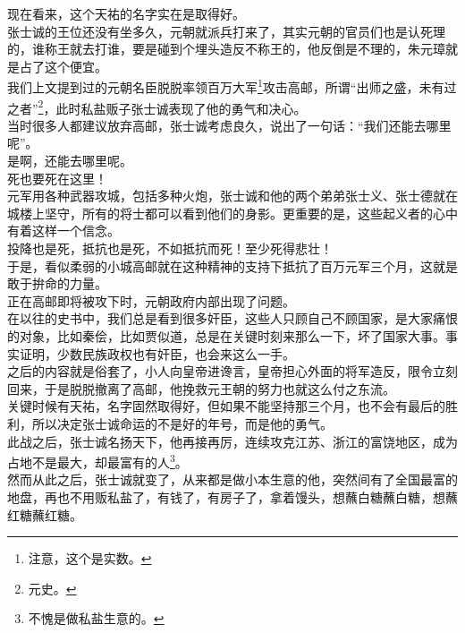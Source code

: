 \begin{multicols}{\theparacolNo}
现在看来，这个天祐的名字实在是取得好。\\

张士诚的王位还没有坐多久，元朝就派兵打来了，其实元朝的官员们也是认死理的，谁称王就去打谁，要是碰到个埋头造反不称王的，他反倒是不理的，朱元璋就是占了这个便宜。\\

我们上文提到过的元朝名臣脱脱率领百万大军\footnote{注意，这个是实数。}攻击高邮，所谓“出师之盛，未有过之者”\footnote{元史。}，此时私盐贩子张士诚表现了他的勇气和决心。\\

当时很多人都建议放弃高邮，张士诚考虑良久，说出了一句话：“我们还能去哪里呢”。\\

是啊，还能去哪里呢。\\

死也要死在这里！\\

元军用各种武器攻城，包括多种火炮，张士诚和他的两个弟弟张士义、张士德就在城楼上坚守，所有的将士都可以看到他们的身影。更重要的是，这些起义者的心中有着这样一个信念。\\

投降也是死，抵抗也是死，不如抵抗而死！至少死得悲壮！\\

于是，看似柔弱的小城高邮就在这种精神的支持下抵抗了百万元军三个月，这就是敢于拚命的力量。\\

正在高邮即将被攻下时，元朝政府内部出现了问题。\\

在以往的史书中，我们总是看到很多奸臣，这些人只顾自己不顾国家，是大家痛恨的对象，比如秦侩，比如贾似道，总是在关键时刻来那么一下，坏了国家大事。事实证明，少数民族政权也有奸臣，也会来这么一手。\\

之后的内容就是俗套了，小人向皇帝进谗言，皇帝担心外面的将军造反，限令立刻回来，于是脱脱撤离了高邮，他挽救元王朝的努力也就这么付之东流。\\

关键时候有天祐，名字固然取得好，但如果不能坚持那三个月，也不会有最后的胜利，所以决定张士诚命运的不是好的年号，而是他的勇气。\\

此战之后，张士诚名扬天下，他再接再厉，连续攻克江苏、浙江的富饶地区，成为占地不是最大，却最富有的人\footnote{不愧是做私盐生意的。}。\\

然而从此之后，张士诚就变了，从来都是做小本生意的他，突然间有了全国最富的地盘，再也不用贩私盐了，有钱了，有房子了，拿着馒头，想蘸白糖蘸白糖，想蘸红糖蘸红糖。\\


\end{multicols}
